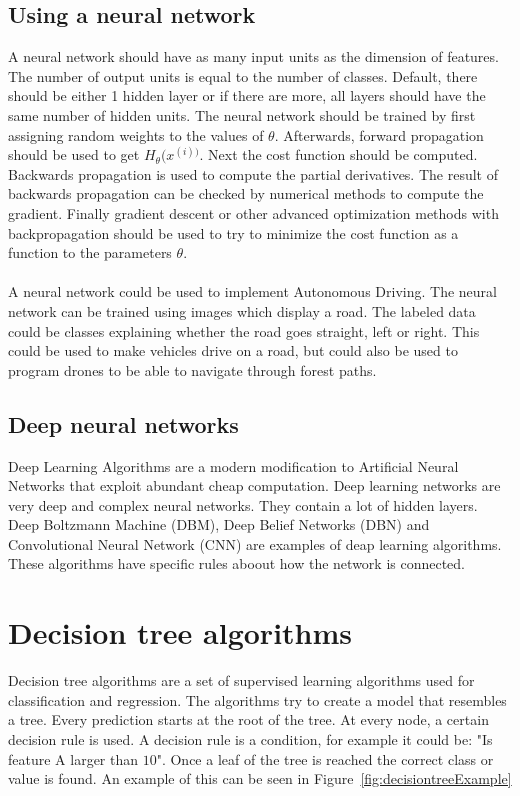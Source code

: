 \subsection{Using a neural network}
A neural network should have as many input units as the dimension of features. The number of output units is equal to the number of classes. Default, there should be either 1 hidden layer or if there are more, all layers should have the same number of hidden units. \cite{neuralnettraining} The neural network should be trained by first assigning random weights to the values of $\theta$. Afterwards, forward propagation should be used to get $H_\theta(x^{(i))}$. Next the cost function should be computed. Backwards propagation is used to compute the partial derivatives. The result of backwards propagation can be checked by numerical methods to compute the gradient. Finally gradient descent or other advanced optimization methods with backpropagation should be used to try to minimize the cost function as a function to the parameters $\theta$.  \\\\
A neural network could be used to implement Autonomous Driving. The neural network can be trained using images which display a road.  \cite{neuralnetDriving} The labeled data could be classes explaining whether the road goes straight,  left or right. This could be used to make vehicles drive on a road, but could also be used to program drones to be able to navigate through forest paths.  \cite{neuralnetDrone}

\subsection{Deep neural networks}
Deep Learning Algorithms are a modern modification to Artificial Neural Networks that exploit abundant cheap computation. Deep learning networks are very deep and complex neural networks. They contain a lot of hidden layers. Deep Boltzmann Machine (DBM), Deep Belief Networks (DBN) and Convolutional Neural Network (CNN) are examples of deap learning algorithms. These algorithms have specific rules aboout how the network is connected. \cite{Goodfellow-et-al-2016-Book}

\section{Decision tree algorithms}
Decision tree algorithms are a set of supervised learning algorithms used for classification and regression. The algorithms try to create a model that resembles a tree. Every prediction starts at the root of the tree. At every node, a certain decision rule is used. A decision rule is a condition, for example it could be: "Is feature A larger than $10$". Once a leaf of the tree is reached the correct class or value is found. \cite{decisiontree} An example of this can be seen in Figure~\ref{fig:decisiontreeExample} \\\\

